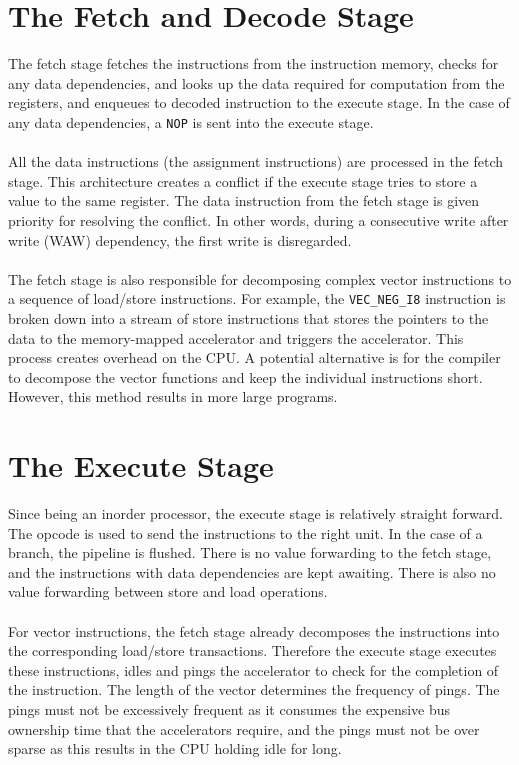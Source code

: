 \begin{paper}
\section*{The Fetch and Decode Stage\sdot}
The fetch stage fetches the instructions from the instruction memory, checks for any data dependencies, and looks up the data required for computation from the registers, and enqueues to decoded instruction to the execute stage. In the case of any data dependencies, a \texttt{NOP} is sent into the execute stage. \\\\
\nointend All the data instructions (the assignment instructions) are processed in the fetch stage. This architecture creates a conflict if the execute stage tries to store a value to the same register. The data instruction from the fetch stage is given priority for resolving the conflict. In other words, during a consecutive write after write (WAW) dependency, the first write is disregarded.\\\\
\nointend The fetch stage is also responsible for decomposing complex vector instructions to a sequence of load/store instructions. For example, the \texttt{VEC\_NEG\_I8} instruction is broken down into a stream of store instructions that stores the pointers to the data to the memory-mapped accelerator and triggers the accelerator. This process creates overhead on the CPU. A potential alternative is for the compiler to decompose the vector functions and keep the individual instructions short. However, this method results in more large programs. 

\section*{The Execute Stage\sdot}
Since being an inorder processor, the execute stage is relatively straight forward. The opcode is used to send the instructions to the right unit. In the case of a branch, the pipeline is flushed. There is no value forwarding to the fetch stage, and the instructions with data dependencies are kept awaiting. There is also no value forwarding between store and load operations. \\\\
\nointend For vector instructions, the fetch stage already decomposes the instructions into the corresponding load/store transactions. Therefore the execute stage executes these instructions, idles and pings the accelerator to check for the completion of the instruction. The length of the vector determines the frequency of pings. The pings must not be excessively frequent as it consumes the expensive bus ownership time that the accelerators require, and the pings must not be over sparse as this results in the CPU holding idle for long.
\end{paper}